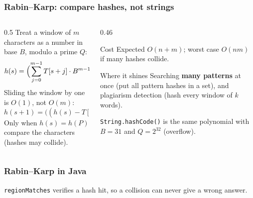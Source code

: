 \documentclass[aspectratio=169,10pt,compress]{beamer}
\begin{document}
\begin{frame}[t,fragile] \frametitle{Rabin--Karp: compare hashes, not strings}
  \begin{columns}[T]
    \begin{column}{0.5\textwidth}
      \small Treat a window of $m$ characters as a number in base $B$, modulo a prime $Q$:
      \[
      	h(s) = \Bigl( \sum_{j=0}^{m-1} T[s + j] \cdot B^{m-1-j} \Bigr) \bmod Q
      \]
      Sliding the window by one is $O(1)$, not $O(m)$:
      \[
      	h(s + 1) = \bigl( (h(s) - T[s] \cdot B^{m-1}) \cdot B + T[s + m] \bigr) \bmod Q
      \]
      Only when $h(s) = h(P)$ compare the characters (hashes may collide).
    \end{column}
    \begin{column}{0.46\textwidth}
      \begin{block}{Cost}
        \small Expected $O(n + m)$; worst case $O(nm)$ if many hashes collide.
      \end{block}
      \begin{block}{Where it shines}
        \small Searching \textbf{many patterns} at once (put all pattern hashes in a set), and plagiarism detection
        (hash every window of $k$ words).
      \end{block}
      \small \texttt{String.hashCode()} is the same polynomial with $B = 31$ and $Q = 2^{32}$ (overflow).
    \end{column}
  \end{columns}
\end{frame}




\begin{frame}[t,fragile] \frametitle{Rabin--Karp in Java}

  \vspace{0.2em}
  \small \texttt{regionMatches} verifies a hash hit, so a collision can never give a wrong answer.
\end{frame}


\end{document}
